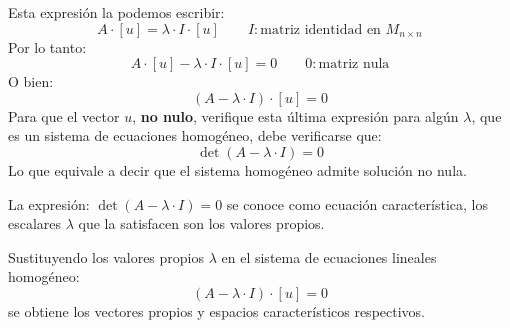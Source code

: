 Esta expresión la podemos escribir:
\[
  A \cdot [u] = \lambda \cdot I \cdot [u] \qquad I : \text{matriz identidad en } M_{n\times n}
\]
Por lo tanto:
\[
  A \cdot [u] - \lambda \cdot I \cdot [u] = 0 \qquad 0:\text{matriz nula}
\]
O bien:
\[
  (A-\lambda \cdot I) \cdot [u] = 0
\]
Para que el vector \(u\), \textbf{no nulo}, verifique esta última expresión para algún \(\lambda\), que es un sistema de ecuaciones homogéneo, debe verificarse que:
\[
\det(A-\lambda \cdot I) = 0
\]
Lo que equivale a decir que el sistema homogéneo admite solución no nula.

La expresión: \(\det(A-\lambda \cdot I) = 0\) se conoce como ecuación característica, los escalares \(\lambda\) que la satisfacen son los valores propios.

Sustituyendo los valores propios \(\lambda\) en el sistema de ecuaciones lineales homogéneo:
\[
  (A-\lambda \cdot I) \cdot [u] = 0
\]
se obtiene los vectores propios y espacios característicos respectivos.

